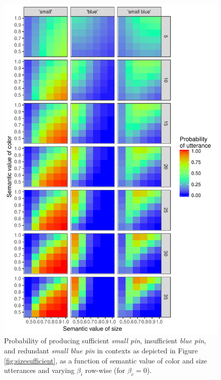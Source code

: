 \documentclass[11pt]{article}
\newcommand{\figref}[1]{Figure \ref{#1}}
\begin{document}
\begin{figure}
\centering
\includegraphics[width=.82\textwidth]{pics/modelexploration-fullfidelityeffect-unlogged-wide}
\caption{Probability of producing sufficient \emph{small pin}, insufficient \emph{blue pin}, and redundant \emph{small blue pin} in contexts as depicted in \figref{fig:sizesufficient}, as a function of semantic value of color and size utterances and varying $\beta_i$ row-wise (for $ \beta_c = 0$).}
\label{fig:fullexploration}
\end{figure}

%
%
\end{document}
